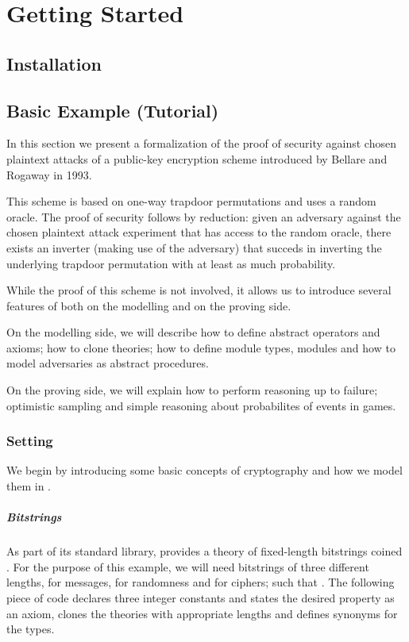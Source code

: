 
\chapter{Getting Started}
\section{Installation}

\section{Basic Example (Tutorial)}
In this section we present a formalization of the proof of security
against chosen plaintext attacks of a public-key encryption scheme
introduced by Bellare and Rogaway in 1993\cite{br93}.

This scheme is based on one-way trapdoor permutations and uses a
random oracle. The proof of security follows by reduction: given an
adversary against the chosen plaintext attack experiment that has
access to the random oracle, there exists an inverter (making use of
the adversary) that succeds in inverting the underlying trapdoor
permutation with at least as much probability.

While the proof of this scheme is not involved, it allows us to
introduce several features of \EC both on the modelling and on
the proving side.

On the modelling side, we will describe how to define abstract operators
and axioms; how to clone theories; how to define module types, modules
and how to model adversaries as abstract procedures.

On the proving side, we will explain how to perform reasoning up to
failure; optimistic sampling and simple reasoning about probabilites
of events in games.

\subsection{Setting}
We begin by introducing some basic concepts of cryptography and how we
model them in \EC.

\paragraph{Bitstrings}
As part of its standard library, \EC provides a theory of fixed-length
bitstrings coined . For the purpose of this example, we will
need bitstrings of three different lengths,  for messages, 
for randomness and  for ciphers; such that . The
following piece of code declares three integer constants and states
the desired property as an axiom, clones the theories with appropriate
lengths and defines synonyms for the types.

